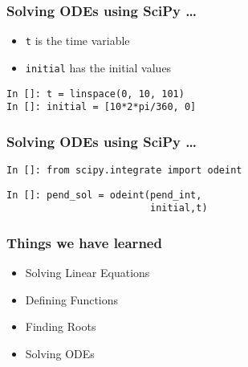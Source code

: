 \documentclass[14pt,compress]{beamer}
\newcounter{time}
\newcommand{\typ}[1]{\lstinline{#1}}
\begin{document}
\begin{frame}[fragile]
\frametitle{Solving ODEs using SciPy \ldots}
\begin{itemize}
\item \typ{t} is the time variable \\ 
\item \typ{initial} has the initial values
\end{itemize}
\begin{lstlisting}
In []: t = linspace(0, 10, 101)
In []: initial = [10*2*pi/360, 0]
\end{lstlisting} 
\end{frame}

\begin{frame}[fragile]
\frametitle{Solving ODEs using SciPy \ldots}
\typ{In []: from scipy.integrate import odeint}
\begin{lstlisting}
In []: pend_sol = odeint(pend_int, 
                         initial,t)
\end{lstlisting}
\end{frame}


\begin{frame}
  \frametitle{Things we have learned}
  \begin{itemize}
  \item Solving Linear Equations
  \item Defining Functions
  \item Finding Roots
  \item Solving ODEs
  \end{itemize}
\end{frame}
\end{document}
